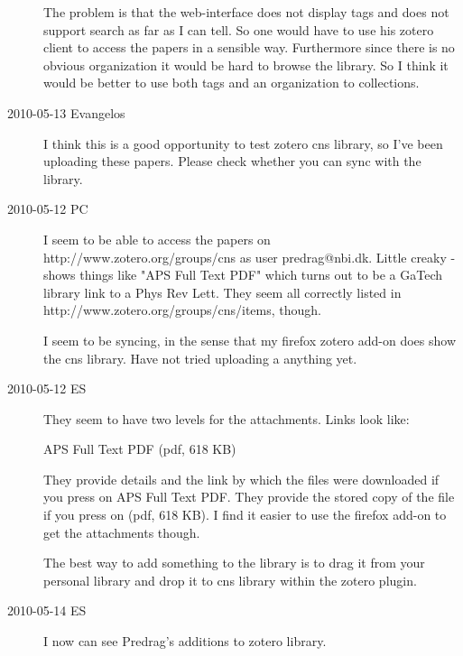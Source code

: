 \begin{description}
The problem is that the web-interface does not display tags and does not support search as far as I can
tell. So one would have to use his zotero client to access the papers in a sensible way. Furthermore
since there is no obvious organization it would be hard to browse the library. So I think it would be
better to use both tags and an organization to collections.

\item[2010-05-13 Evangelos]
I think this is a good opportunity to test zotero cns library, so I've been uploading these
papers. Please check whether you can sync with the library.

\item[2010-05-12 PC] I seem to be able to access the papers on
{http://www.zotero.org/groups/cns} as user predrag@nbi.dk. Little creaky
- shows things like "APS Full Text PDF" which turns out to be a GaTech
library link to a Phys Rev Lett. They seem all correctly listed in
{http://www.zotero.org/groups/cns/items}, though.

I seem to be syncing, in the sense that my firefox zotero add-on
does show the cns library. Have not tried uploading a
anything yet.

\item[2010-05-12 ES] They seem to have two levels for the attachments.
Links look like:

APS Full Text PDF  (pdf, 618 KB)

They provide details and the link by which the files were downloaded if you press
on APS Full Text PDF. They provide the stored copy of the file if you press
on (pdf, 618 KB). I find it easier to use the firefox add-on to get the attachments though.

The best  way to add something to the library
is to drag it from your personal library and drop it to cns library within the zotero plugin.

\item[2010-05-14 ES]

I now can see Predrag's additions to zotero library.




\end{description}

